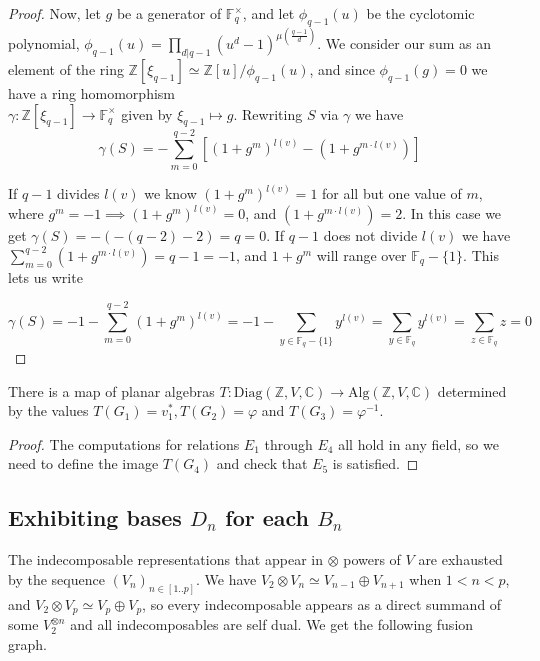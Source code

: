 \documentclass[11pt]{article} %
\begin{document}
\begin{lemma}
\begin{proof}
Now, let $g$ be a generator of $\mathbb{F}_q^{\times}$, and let $\phi_{q-1}(u)$ be the cyclotomic polynomial, $\phi_{q-1}(u) = \prod_{d|q-1}{(u^d-1)^{\mu(\frac{q-1}{d})}}$. We consider our sum as an element of the ring $\mathbb{Z}[\xi_{q-1}] \simeq \mathbb{Z}[u]/ \phi_{q-1}(u)$, and since $\phi_{q-1}(g)=0$ we have a ring homomorphism \\ $\gamma: \mathbb{Z}[\xi_{q-1}] \rightarrow \mathbb{F}_q^{\times}$ given by $\xi_{q-1} \mapsto g$. Rewriting $S$ via $\gamma$ we have
$$
\gamma(S) = - \sum_{m=0}^{q-2}[(1+g^m)^{l(v)}-(1 + g^{m \cdot l(v)})]
$$

If $q-1$ divides $l(v)$ we know $(1 + g^m)^{l(v)} = 1$ for all but one value of $m$, where $g^m=-1 \implies (1+g^m)^{l(v)}=0$, and $(1+g^{m\cdot l(v)}) = 2$. In this case we get $\gamma(S) = - (-(q-2)-2) = q = 0$.  If $q-1$ does not divide $l(v)$ we have $\sum_{m=0}^{q-2}(1+g^{m\cdot l(v)}) = q-1 = -1$, and $1 + g^m$ will range over $\mathbb{F}_q - \{1\}$. This lets us write

$$
\gamma(S) = -1-\sum_{m=0}^{q-2}(1+g^m)^{l(v)}=-1-\sum_{y \in \mathbb{F}_q-\{1\}}{y^{l(v)}} = \sum_{y \in \mathbb{F}_q}{y^{l(v)}}=\sum_{z \in \mathbb{F}_q}{z} = 0 
$$ 

\end{proof}
\end{lemma}




\begin{prop} There is a map of planar algebras $T:\text{Diag}{(\mathbb{Z},V,\mathbb{C})} \rightarrow \text{Alg}{(\mathbb{Z},V,\mathbb{C})}$ determined by the values $T(G_1)=v_1^{\ast},T(G_2)=\varphi$ and $T(G_3)=\varphi^{-1}$.
\end{prop}
\begin{proof} The computations for relations $E_1$ through $E_4$ all hold in any field, so we need to define the image $T(G_4)$ and check that $E_5$ is satisfied.
\end{proof}

\subsection{Exhibiting bases $D_n$ for each $B_n$}

The indecomposable representations that appear in $\otimes$ powers of $V$ are exhausted by the sequence $(V_n)_{n \in [1..p]}$. We have $V_2 \otimes V_n \simeq V_{n-1} \oplus V_{n+1}$ when $1 < n < p$, and $V_2 \otimes V_p \simeq V_p \oplus V_p$, so every indecomposable appears as a direct summand of some $V_2^{\otimes n}$ and all indecomposables are self dual. We get the following fusion graph.
\end{document}
